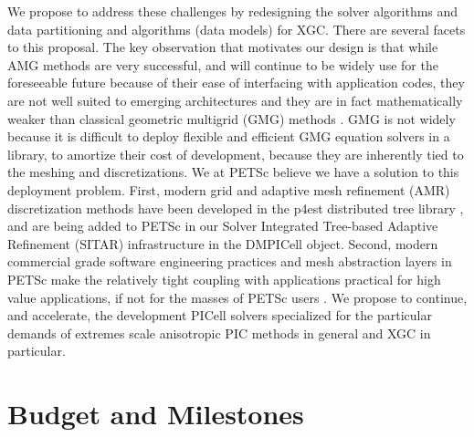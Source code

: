 \documentclass[review]{siamart}
\begin{document}
We propose to address these challenges by redesigning the solver algorithms and data partitioning and algorithms (data models) for XGC.
There are several facets to this proposal.
The key observation that motivates our design is that while AMG methods are very successful, and will continue to be widely use for the foreseeable future because of their ease of interfacing with application codes, they are not well suited to emerging architectures and they are in fact mathematically weaker than classical geometric multigrid (GMG) methods \cite{Brandt-77}.
GMG is not widely because it is difficult to deploy flexible and efficient GMG equation solvers in a library, to amortize their cost of development, because they are inherently tied to the meshing and discretizations.
We at PETSc believe we have a solution to this deployment problem.
First, modern grid and adaptive mesh refinement (AMR) discretization methods have been developed in the p4est distributed tree library \cite{DBLP:journals/siamsc/IsaacBWG15,Rudi:2015:EIS:2807591.2807675,Stadler1033}, and are being added to PETSc in our Solver Integrated Tree-based Adaptive Refinement (SITAR) infrastructure in the DMPICell object.
Second, modern commercial grade software engineering practices and mesh abstraction layers in PETSc make the relatively tight coupling with applications practical for high value applications, if not for the masses of PETSc users \cite{KnepleyBrownMcInnesSmithRuppAdams2015b}.
We propose to continue, and accelerate, the development PICell solvers specialized for the particular demands of extremes scale anisotropic PIC methods in general and XGC in particular.

\section{Budget and Milestones}
\label{sec:mile}
\end{document}
